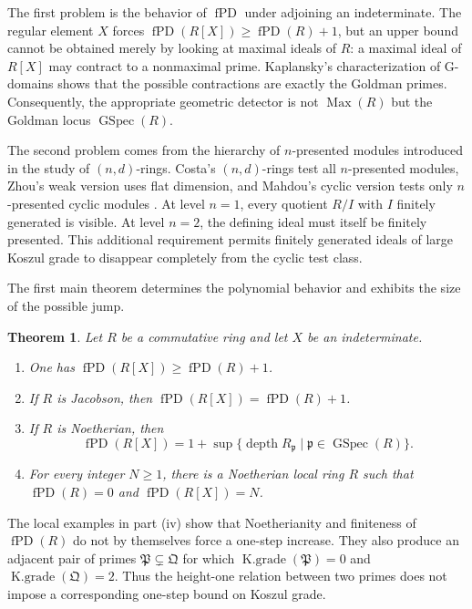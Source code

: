 \documentclass[11pt]{amsart}
\numberwithin{equation}{section}
\newtheorem{theorem}{Theorem}[section]
\theoremstyle{definition}
\theoremstyle{remark}
\newcommand{\fPD}{\operatorname{fPD}}
\newcommand{\Max}{\operatorname{Max}}
\newcommand{\GSpec}{\operatorname{GSpec}}
\newcommand{\depth}{\operatorname{depth}}
\newcommand{\Kgr}{\operatorname{K.grade}}
\begin{document}
The first problem is the behavior of $\fPD$ under adjoining an indeterminate.  The regular element $X$ forces $\fPD(R[X])\geq\fPD(R)+1$, but an upper bound cannot be obtained merely by looking at maximal ideals of $R$: a maximal ideal of $R[X]$ may contract to a nonmaximal prime.  Kaplansky's characterization of G-domains shows that the possible contractions are exactly the Goldman primes.  Consequently, the appropriate geometric detector is not $\Max(R)$ but the Goldman locus $\GSpec(R)$.

The second problem comes from the hierarchy of $n$-presented modules introduced in the study of $(n,d)$-rings.  Costa's $(n,d)$-rings test all $n$-presented modules, Zhou's weak version uses flat dimension, and Mahdou's cyclic version tests only $n$-presented cyclic modules \cite{Costa, Mahdou, Zhou}.  At level $n=1$, every quotient $R/I$ with $I$ finitely generated is visible.  At level $n=2$, the defining ideal must itself be finitely presented.  This additional requirement permits finitely generated ideals of large Koszul grade to disappear completely from the cyclic test class.

The first main theorem determines the polynomial behavior and exhibits the size of the possible jump.

\begin{theorem}\label{thm:intro-polynomial}
Let $R$ be a commutative ring and let $X$ be an indeterminate.
\begin{enumerate}[label=\textup{(\roman*)}]
\item \cite[Proposition 4.1]{ZhangII} One has $\fPD(R[X])\geq\fPD(R)+1$.
\item \cite[Theorem 4.2]{ZhangII} If $R$ is Jacobson, then $\fPD(R[X])=\fPD(R)+1$.
\item If $R$ is Noetherian, then
\[
 \fPD(R[X])
 =1+\sup\{\depth R_{\mathfrak p}\mid \mathfrak p\in\GSpec(R)\}.
\]
\item For every integer $N\geq1$, there is a Noetherian local ring $R$ such that $\fPD(R)=0$ and $\fPD(R[X])=N$.
\end{enumerate}
\end{theorem}

The local examples in part (iv) show that Noetherianity and finiteness of $\fPD(R)$ do not by themselves force a one-step increase.  They also produce an adjacent pair of primes $\mathfrak P\subsetneq\mathfrak Q$ for which $\Kgr(\mathfrak P)=0$ and $\Kgr(\mathfrak Q)=2$.  Thus the height-one relation between two primes does not impose a corresponding one-step bound on Koszul grade.
\end{document}
